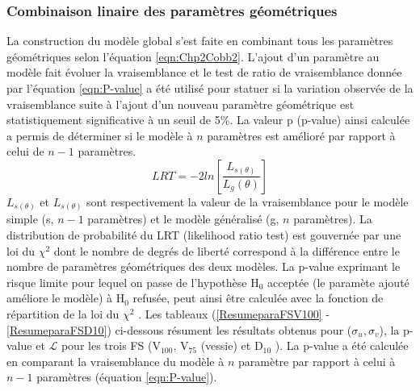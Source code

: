 \subsubsection{Combinaison linaire des paramètres géométriques}
La construction du modèle global s’est faite en combinant tous les paramètres géométriques selon l’équation \ref{eqn:Chp2Cobb2}.  L’ajout d’un paramètre au modèle fait évoluer la vraisemblance et le test de ratio de vraisemblance donnée par l’équation \ref{eqn:P-value} a été utilisé pour statuer si la variation observée de la vraisemblance suite à l’ajout d’un nouveau paramètre géométrique est statistiquement significative à un seuil de 5\%. La valeur p (p-value) ainsi calculée a permis de déterminer si le modèle à $n$ paramètres est amélioré par rapport à celui de $n-1$ paramètres.
%
\begin{equation}\label{eqn:P-value}
LRT = -2ln\left[\frac{L_{s\left(\theta\right)}}{L_{g}\left(\theta\right)}\right]
\end{equation}
%
$L_{s\left(\theta\right)}$ et $L_{s\left(\theta\right)}$ sont respectivement la valeur de la vraisemblance pour le modèle simple (s, $n-1$ paramètres) et le modèle généralisé (g, $n$ paramètres). La distribution de probabilité du LRT (likelihood ratio test)  est gouvernée par une loi du $\chi^{2}$ dont le nombre de degrés de liberté correspond à la différence entre le nombre de paramètres géométriques des deux modèles. La p-value exprimant le risque limite pour lequel on passe de l'hypothèse H$_{0}$ acceptée (le paramète ajouté améliore le modèle) à H$_{0}$ refusée, peut ainsi être calculée avec la fonction de répartition de la loi du $\chi^{2}$ \cite{P-value1,p-value2}. Les tableaux (\ref{ResumeparaFSV100} - \ref{ResumeparaFSD10}) ci-dessous résument les résultats obtenus pour ($\sigma_{u}, \sigma_{v}$), la p-value et $\mathcal{L}$ pour les trois FS (V$_{100}$, V$_{75}$ (vessie) et D$_{10}$ ). La p-value a été calculée en comparant la vraisemblance du modèle à $n$ paramètre par rapport à celui à $n-1$ paramètres (équation \ref{eqn:P-value}). 
%
